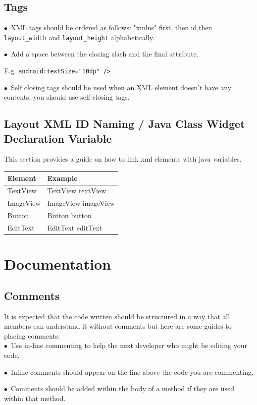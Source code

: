 \documentclass[english]{article}
\begin{document}
	\subsection{Tags}
$\bullet$\ XML tags should be ordered as follows: "xmlns" first, then id,then  \texttt{layout\_width} and  \texttt{layout\_height} alphabetically. \par
$\bullet$\ Add a space between the closing slash and the final attribute.\par E.g.  \texttt{android:textSize="10dp" /> }\par
$\bullet$\ Self closing tags should be used when an XML element doesn't have any contents, you should use self closing tags. \par

\subsection{Layout XML ID Naming / Java Class Widget Declaration Variable}
				
This section provides a guide on how to link xml elements with java variables.
				\\
				\begin{tabular}{ |p{3cm}|p{9cm}|  }
				\hline
				\textbf{Element} & \textbf{Example}  \\
				\hline
				TextView &	TextView textView\\
				\hline
				ImageView &	ImageView imageView\\
				\hline
				Button &	Button button\\
				\hline
				EditText &	EditText editText \\
				\hline
				\end{tabular}
\section{Documentation}

\subsection{Comments}
It is expected that the code written should be structured in a way that all members can understand it without comments but here are some guides to placing comments:\\
$\bullet$\ Use in-line commenting to help the next developer who might be editing your code.\par
$\bullet$\ Inline comments should appear on the line above the code you are commenting.\par
$\bullet$\ Comments should be added within the body of a method if they are used within that method.\par
\end{document}

